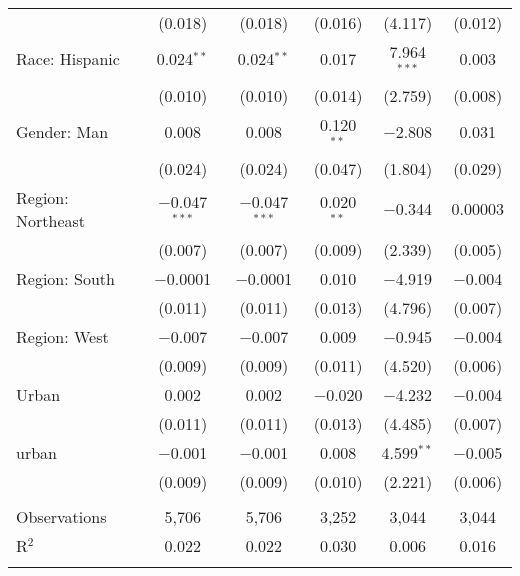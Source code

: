 \begin{tabular}{@{\extracolsep{5pt}}lccccc}
  & (0.018) & (0.018) & (0.016) & (4.117) & (0.012) \\ 
  Race: Hispanic & 0.024$^{**}$ & 0.024$^{**}$ & 0.017 & 7.964$^{***}$ & 0.003 \\ 
  & (0.010) & (0.010) & (0.014) & (2.759) & (0.008) \\ 
  Gender: Man & 0.008 & 0.008 & 0.120$^{**}$ & $-$2.808 & 0.031 \\ 
  & (0.024) & (0.024) & (0.047) & (1.804) & (0.029) \\ 
  Region: Northeast & $-$0.047$^{***}$ & $-$0.047$^{***}$ & 0.020$^{**}$ & $-$0.344 & 0.00003 \\ 
  & (0.007) & (0.007) & (0.009) & (2.339) & (0.005) \\ 
  Region: South & $-$0.0001 & $-$0.0001 & 0.010 & $-$4.919 & $-$0.004 \\ 
  & (0.011) & (0.011) & (0.013) & (4.796) & (0.007) \\ 
  Region: West & $-$0.007 & $-$0.007 & 0.009 & $-$0.945 & $-$0.004 \\ 
  & (0.009) & (0.009) & (0.011) & (4.520) & (0.006) \\ 
  Urban & 0.002 & 0.002 & $-$0.020 & $-$4.232 & $-$0.004 \\ 
  & (0.011) & (0.011) & (0.013) & (4.485) & (0.007) \\ 
  urban & $-$0.001 & $-$0.001 & 0.008 & 4.599$^{**}$ & $-$0.005 \\ 
  & (0.009) & (0.009) & (0.010) & (2.221) & (0.006) \\ 
 \hline \\[-1.8ex] 

Observations & 5,706 & 5,706 & 3,252 & 3,044 & 3,044 \\ 
R$^{2}$ & 0.022 & 0.022 & 0.030 & 0.006 & 0.016 \\ 
\hline 
\hline \\[-1.8ex] 
\end{tabular} 